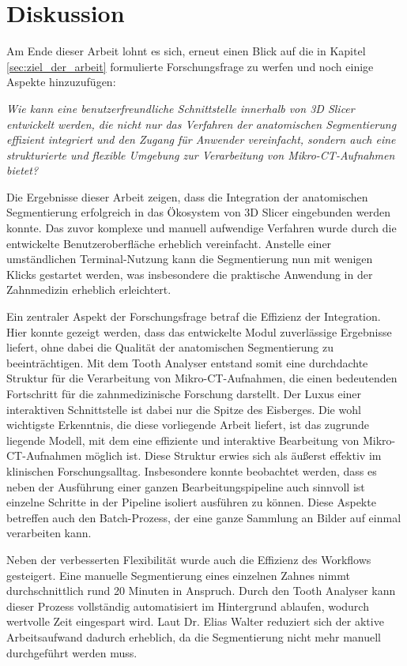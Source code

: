 \chapter{Diskussion}
\label{chap:diskussion} Am Ende dieser Arbeit lohnt es sich, erneut einen Blick
auf die in Kapitel \ref{sec:ziel_der_arbeit} formulierte Forschungsfrage zu
werfen und noch einige Aspekte hinzuzufügen:

\begin{center}
	\textit{Wie kann eine benutzerfreundliche Schnittstelle innerhalb von 3D
	Slicer entwickelt werden, die nicht nur das Verfahren der anatomischen Segmentierung
	effizient integriert und den Zugang für Anwender vereinfacht, sondern auch
	eine strukturierte und flexible Umgebung zur Verarbeitung von Mikro-\ac{CT}-Aufnahmen
	bietet?}
\end{center}

Die Ergebnisse dieser Arbeit zeigen, dass die Integration der anatomischen
Segmentierung erfolgreich in das Ökosystem von 3D Slicer eingebunden werden
konnte. Das zuvor komplexe und manuell aufwendige Verfahren wurde durch die entwickelte
Benutzeroberfläche erheblich vereinfacht. Anstelle einer umständlichen Terminal-Nutzung
kann die Segmentierung nun mit wenigen Klicks gestartet werden, was insbesondere
die praktische Anwendung in der Zahnmedizin erheblich erleichtert.

Ein zentraler Aspekt der Forschungsfrage betraf die Effizienz der Integration.
Hier konnte gezeigt werden, dass das entwickelte Modul zuverlässige Ergebnisse liefert,
ohne dabei die Qualität der anatomischen Segmentierung zu beeinträchtigen. Mit dem
Tooth Analyser entstand somit eine durchdachte Struktur für die Verarbeitung von
Mikro-\ac{CT}-Aufnahmen, die einen bedeutenden Fortschritt für die zahnmedizinische
Forschung darstellt. Der Luxus einer interaktiven Schnittstelle ist dabei nur
die Spitze des Eisberges. Die wohl wichtigste Erkenntnis, die diese vorliegende
Arbeit liefert, ist das zugrunde liegende Modell, mit dem eine effiziente und
interaktive Bearbeitung von Mikro-CT-Aufnahmen möglich ist. Diese Struktur erwies
sich als äußerst effektiv im klinischen Forschungsalltag. Insbesondere konnte
beobachtet werden, dass es neben der Ausführung einer ganzen Bearbeitungspipeline
auch sinnvoll ist einzelne Schritte in der Pipeline isoliert ausführen zu können.
Diese Aspekte betreffen auch den Batch-Prozess, der eine ganze Sammlung an Bilder
auf einmal verarbeiten kann.

Neben der verbesserten Flexibilität wurde auch die Effizienz des Workflows gesteigert.
Eine manuelle Segmentierung eines einzelnen Zahnes nimmt durchschnittlich rund
20 Minuten in Anspruch. Durch den Tooth Analyser kann dieser Prozess vollständig
automatisiert im Hintergrund ablaufen, wodurch wertvolle Zeit eingespart wird. Laut
Dr. Elias Walter reduziert sich der aktive Arbeitsaufwand dadurch erheblich, da die
Segmentierung nicht mehr manuell durchgeführt werden muss.

